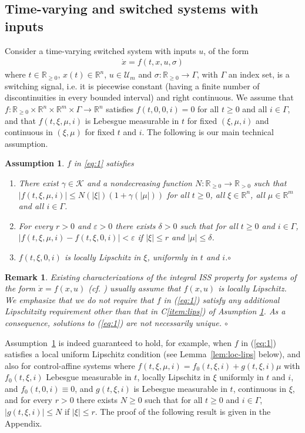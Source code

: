 \documentclass[9pt,final,journal]{IEEEtran}
\newtheorem{remark}{Remark}
\newtheorem{as}{Assumption}
\def\K{\mathcal{K}}
\def\R{\mathbb{R}}
\def\U{\mathcal{U}}
\def\mer{\hfill $\circ$}
\begin{document}
\subsection{Time-varying and switched systems with inputs}
\label{sec:tvswsys}

Consider a time-varying switched system with inputs $u$, of the form
\begin{align}
  \label{eq:1}
  \dot x = f(t,x,u,\sigma)
\end{align}
where $t\in\R_{\ge 0}$, $x(t)\in\R^n$, $u \in \U_m$ and $\sigma:\R_{\ge 0}\to \Gamma$, with $\Gamma$ an index set, is a switching signal, i.e. it is piecewise constant (having a finite number of discontinuities in every bounded interval) and right continuous. We assume that $f:\R_{\ge 0}\times \R^n\times \R^m\times \Gamma\to \R^n$
satisfies $f(t,0,0,i)=0$ for all $t\ge 0$ and all $i\in\Gamma$, and that $f(t,\xi,\mu,i)$ is Lebesgue measurable in $t$ for fixed $(\xi,\mu,i)$ and continuous in $(\xi,\mu)$ for fixed $t$ and $i$. The following is our main technical assumption.
\begin{as} \label{ass:A}
 $f$ in \eqref{eq:1} satisfies
 \begin{enumerate}[C1)]
  \item \label{item:bound} There exist $\gamma \in \K$ and a nondecreasing function $N:\R_{\ge 0}\to \R_{>0}$ such that 
 $|f(t,\xi,\mu,i)|\le 
N(|\xi|)(1+\gamma(|\mu|))$ for all $t\ge 0$, all $\xi \in \R^n$, all $\mu\in \R^m$ and all $i\in \Gamma$.
\item For every $r>0$ and $\varepsilon >0$ there exists $\delta>0$ such that for all $t\ge 0$ and $i\in \Gamma$, 
$|f(t,\xi,\mu,i)-f(t,\xi,0,i)|<\varepsilon$ if $|\xi|\le r$ and $|\mu|\le\delta$.\label{item:fcont}
 \item  \label{item:lips} $f(t,\xi,0,i)$ is locally Lipschitz in $\xi$, 
 uniformly in $t$ and $i$.\mer
\end{enumerate} 
\end{as}
\begin{remark}
  Existing characterizations of the integral ISS property for systems of the form $\dot x = f(x,u)$ (cf. \cite{sontag_scl98,angson_tac00,angson_dc00}) usually assume that $f(x,u)$ is locally Lipschitz. We emphasize that we do not require that $f$ in (\ref{eq:1}) satisfy any additional Lipschitzity requirement other than that in C\ref{item:lips}) of  Asumption \ref{ass:A}. As a consequence, solutions to (\ref{eq:1}) are not necessarily unique. \mer
\end{remark}
Assumption~\ref{ass:A} is indeed guaranteed to hold, for example, when $f$ in (\ref{eq:1}) satisfies a local uniform Lipschitz condition (see Lemma~\ref{lem:loc-lips} below), and also for control-affine systems where $f(t,\xi,\mu,i) = f_0(t,\xi,i)+g(t,\xi,i) \mu$ with $f_0(t,\xi,i)$ Lebesgue measurable in $t$, locally Lipschitz in $\xi$ uniformly in $t$ and $i$, and $f_0(t,0,i)\equiv 0$, and $g(t,\xi,i)$ is Lebesgue measurable in $t$, continuous in $\xi$, and for every $r>0$ there exists $N\ge 0$ such that for all $t\ge 0$ and $i\in \Gamma$, $|g(t,\xi,i)|\le N$ if $|\xi|\le r$. The proof of the following result is given in the Appendix.
\end{document}
